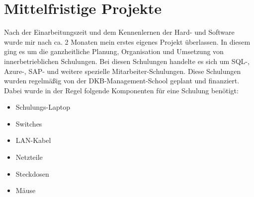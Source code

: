 \section{Mittelfristige Projekte}
\label{sec:Mittelfristige Projekte}

Nach der Einarbeitungszeit und dem Kennenlernen der Hard- und Software wurde mir nach ca. 2 Monaten mein erstes eigenes Projekt überlassen. In diesem ging es um die ganzheitliche Planung, Organisation und Umsetzung von innerbetrieblichen Schulungen. Bei diesen Schulungen handelte es sich um SQL-, Azure-, SAP- und weitere spezielle Mitarbeiter-Schulungen. Diese Schulungen wurden regelmäßig von der DKB-Management-School geplant und finanziert. Dabei wurde in der Regel folgende Komponenten für eine Schulung benötigt:
\begin{itemize}
	\item Schulungs-Laptop
	\item Switches
	\item LAN-Kabel
	\item Netzteile
	\item Steckdosen
	\item Mäuse
\end{itemize}
\noindent
